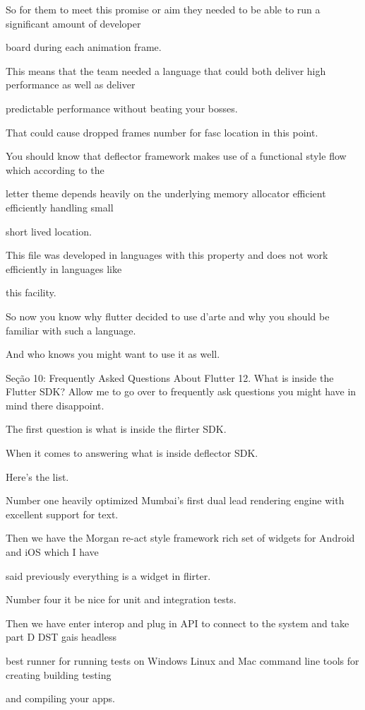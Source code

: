So for them to meet this promise or aim they needed to be able to run a significant amount of developer

board during each animation frame.

This means that the team needed a language that could both deliver high performance as well as deliver

predictable performance without beating your bosses.

That could cause dropped frames number for fasc location in this point.

You should know that deflector framework makes use of a functional style flow which according to the

letter theme depends heavily on the underlying memory allocator efficient efficiently handling small

short lived location.

This file was developed in languages with this property and does not work efficiently in languages like

this facility.

So now you know why flutter decided to use d'arte and why you should be familiar with such a language.

And who knows you might want to use it as well.


Seção 10: Frequently Asked Questions About Flutter
12. What is inside the Flutter SDK?
Allow me to go over to frequently ask questions you might have in mind there disappoint.

The first question is what is inside the flirter SDK.

When it comes to answering what is inside deflector SDK.

Here's the list.

Number one heavily optimized Mumbai's first dual lead rendering engine with excellent support for text.

Then we have the Morgan re-act style framework rich set of widgets for Android and iOS which I have

said previously everything is a widget in flirter.

Number four it be nice for unit and integration tests.

Then we have enter interop and plug in API to connect to the system and take part D DST gais headless

best runner for running tests on Windows Linux and Mac command line tools for creating building testing

and compiling your apps.

